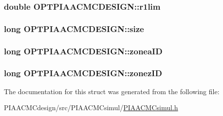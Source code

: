 \hypertarget{structOPTPIAACMCDESIGN_a4842ab89cd721c1c83af3d4b728ffcf6}{
\subsubsection[{r1lim}]{\setlength{\rightskip}{0pt plus 5cm}double O\+P\+T\+P\+I\+A\+A\+C\+M\+C\+D\+E\+S\+I\+G\+N\+::r1lim}}\label{structOPTPIAACMCDESIGN_a4842ab89cd721c1c83af3d4b728ffcf6}
\hypertarget{structOPTPIAACMCDESIGN_a9a77cc42ff9de1dbd1d484e7020da6eb}{
\subsubsection[{size}]{\setlength{\rightskip}{0pt plus 5cm}long O\+P\+T\+P\+I\+A\+A\+C\+M\+C\+D\+E\+S\+I\+G\+N\+::size}}\label{structOPTPIAACMCDESIGN_a9a77cc42ff9de1dbd1d484e7020da6eb}
\hypertarget{structOPTPIAACMCDESIGN_afdfb76344ee9a82f3a5790fcb602ade6}{
\subsubsection[{zonea\+I\+D}]{\setlength{\rightskip}{0pt plus 5cm}long O\+P\+T\+P\+I\+A\+A\+C\+M\+C\+D\+E\+S\+I\+G\+N\+::zonea\+I\+D}}\label{structOPTPIAACMCDESIGN_afdfb76344ee9a82f3a5790fcb602ade6}
\hypertarget{structOPTPIAACMCDESIGN_a46c2ef78ec06d39b947a793d0a03dc28}{
\subsubsection[{zonez\+I\+D}]{\setlength{\rightskip}{0pt plus 5cm}long O\+P\+T\+P\+I\+A\+A\+C\+M\+C\+D\+E\+S\+I\+G\+N\+::zonez\+I\+D}}\label{structOPTPIAACMCDESIGN_a46c2ef78ec06d39b947a793d0a03dc28}


The documentation for this struct was generated from the following file\+:\begin{DoxyCompactItemize}
\item 
P\+I\+A\+A\+C\+M\+Cdesign/src/\+P\+I\+A\+A\+C\+M\+Csimul/\hyperlink{PIAACMCdesign_2src_2PIAACMCsimul_2PIAACMCsimul_8h}{P\+I\+A\+A\+C\+M\+Csimul.\+h}\end{DoxyCompactItemize}
